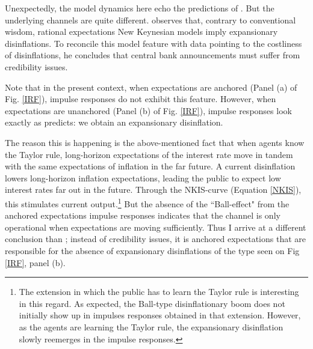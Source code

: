 \documentclass[11pt]{article}
\renewcommand{\[}{\begin{equation}}
\renewcommand{\]}{\end{equation}}
\begin{document}
Unexpectedly, the model dynamics here echo the predictions of \cite{ball1994credible}. But the underlying channels are quite different. \cite{ball1994credible} observes that, contrary to conventional wisdom, rational expectations New Keynesian models imply expansionary disinflations. To reconcile this model feature with data pointing to the costliness of disinflations, he concludes that central bank announcements must suffer from credibility issues. 

Note that in the present context, when expectations are anchored (Panel (a) of Fig. \ref{IRF}), impulse responses do not exhibit this feature. However, when expectations are unanchored (Panel (b) of Fig. \ref{IRF}), impulse responses look exactly as \cite{ball1994credible} predicts: we obtain an expansionary disinflation. 

The reason this is happening is the above-mentioned fact that when agents know the Taylor rule, long-horizon expectations of the interest rate move in tandem with the same expectations of inflation in the far future. A current disinflation lowers long-horizon inflation expectations, leading the public to expect low interest rates far out in the future. Through the NKIS-curve (Equation \ref{NKIS}), this stimulates current output.\footnote{The extension in which the public has to learn the Taylor rule is interesting in this regard. As expected, the Ball-type disinflationary boom does not initially show up in impulses responses obtained in that extension. However, as the agents are learning the Taylor rule, the expansionary disinflation slowly reemerges in the impulse responses.} But the absence of the ``Ball-effect" from the anchored expectations impulse responses indicates that the channel is only operational when expectations are moving sufficiently. Thus I arrive at a different conclusion than \cite{ball1994credible}; instead of credibility issues, it is anchored expectations that are responsible for the absence of expansionary disinflations of the type seen on Fig \ref{IRF}, panel (b).
\end{document}
